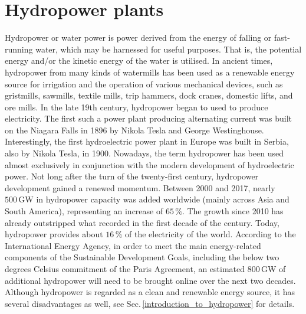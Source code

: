 \section{Hydropower plants}

Hydropower or water power is power derived from the energy of falling or fast-running water, which may be harnessed for useful purposes. That is, the potential energy and/or the kinetic energy of the water is utilised. In ancient times, hydropower from many kinds of watermills has been used as a renewable energy source for irrigation and the operation of various mechanical devices, such as gristmills, sawmills, textile mills, trip hammers, dock cranes, domestic lifts, and ore mills. In the late 19th century, hydropower began to used to produce electricity. The first such a power plant producing alternating current was built on the Niagara Falls in 1896 by Nikola Tesla and George Westinghouse. Interestingly, the first hydroelectric power plant in Europe was built in Serbia, also by Nikola Tesla, in 1900. Nowadays, the term hydropower has been used almost exclusively in conjunction with the modern development of hydroelectric power. Not long after the turn of the twenty-first century, hydropower development gained a renewed momentum. Between 2000 and 2017, nearly $500\,\mathrm{GW}$ in hydropower capacity was added worldwide (mainly across Asia and South America), representing an increase of $65\,\%$. The growth since 2010 has already outstripped what recorded in the first decade of the century. Today, hydropower provides about $16\,\%$ of the electricity of the world. According to the International Energy Agency, in order to meet the main energy-related components of the Sustainable Development Goals, including the below two degrees Celsius commitment of the Paris Agreement, an estimated $800\,\mathrm{GW}$ of additional hydropower will need to be brought online over the next two decades. Although hydropower is regarded as a clean and renewable energy source, it has several disadvantages as well, see Sec.\,\ref{introduction_to_hydropower} for details.

